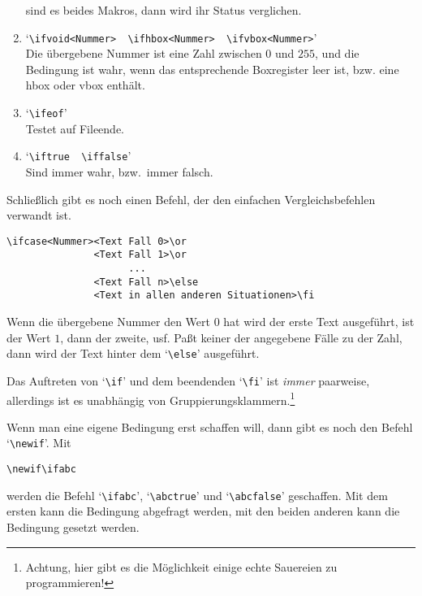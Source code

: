 \begin{enumerate}
sind es beides Makros, dann wird ihr Status verglichen.
\item {}
`\verb|\ifvoid<Nummer>  \ifhbox<Nummer>  \ifvbox<Nummer>|'\\ Die
\"ubergebene Nummer ist eine Zahl zwischen $0$ und $255$, und die
Bedingung ist wahr, wenn das entsprechende Boxregister
leer ist, bzw.
eine hbox oder vbox enth\"alt.
\item {}
`\verb|\ifeof|'\\Testet auf Fileende.
\item {}
`\verb|\iftrue  \iffalse|'\\Sind immer wahr, bzw.\ immer falsch.
\end{enumerate}
Schlie\ss{}lich gibt es noch einen Befehl, der den einfachen
Vergleichsbefehlen verwandt ist.
\begin{verbatim}
\ifcase<Nummer><Text Fall 0>\or
               <Text Fall 1>\or
                     ...
               <Text Fall n>\else
               <Text in allen anderen Situationen>\fi
\end{verbatim}
Wenn die \"ubergebene Nummer den Wert $0$ hat wird der erste Text
ausgef\"uhrt, ist der Wert $1$, dann der zweite, usf. Pa\ss{}t keiner der
angegebene F\"alle zu der Zahl, dann wird der Text hinter dem
`\verb|\else|' ausgef\"uhrt.

Das Auftreten von `\verb|\if|' und dem beendenden
`\verb|\fi|' ist
{\em immer} paarweise, allerdings ist es unabh\"angig von
Gruppierungsklammern.\footnote{Achtung, hier
gibt es die M\"oglichkeit einige echte Sauereien zu programmieren!}

Wenn man eine eigene Bedingung erst schaffen will, dann gibt es noch
den Befehl `\verb|\newif|'. Mit
\begin{verbatim}
\newif\ifabc
\end{verbatim}
werden die Befehl `\verb|\ifabc|', 
`\verb|\abctrue|' und
`\verb|\abcfalse|' geschaffen. Mit dem ersten kann die Bedingung
abgefragt werden, mit den beiden anderen kann die Bedingung gesetzt
werden.

